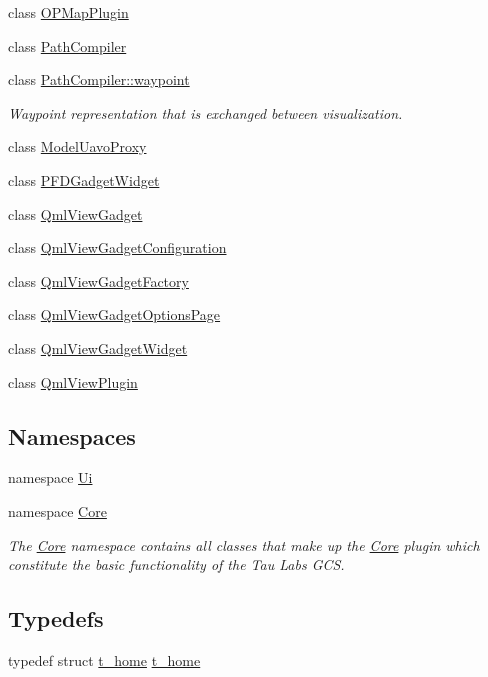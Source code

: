 \begin{DoxyCompactItemize}
\item 
class \hyperlink{class_o_p_map_plugin}{\-O\-P\-Map\-Plugin}
\item 
class \hyperlink{class_path_compiler}{\-Path\-Compiler}
\item 
class \hyperlink{class_path_compiler_1_1waypoint}{\-Path\-Compiler\-::waypoint}
\begin{DoxyCompactList}\small\item\em \-Waypoint representation that is exchanged between visualization. \end{DoxyCompactList}\item 
class \hyperlink{class_model_uavo_proxy}{\-Model\-Uavo\-Proxy}
\item 
class \hyperlink{class_p_f_d_gadget_widget}{\-P\-F\-D\-Gadget\-Widget}
\item 
class \hyperlink{class_qml_view_gadget}{\-Qml\-View\-Gadget}
\item 
class \hyperlink{class_qml_view_gadget_configuration}{\-Qml\-View\-Gadget\-Configuration}
\item 
class \hyperlink{class_qml_view_gadget_factory}{\-Qml\-View\-Gadget\-Factory}
\item 
class \hyperlink{class_qml_view_gadget_options_page}{\-Qml\-View\-Gadget\-Options\-Page}
\item 
class \hyperlink{class_qml_view_gadget_widget}{\-Qml\-View\-Gadget\-Widget}
\item 
class \hyperlink{class_qml_view_plugin}{\-Qml\-View\-Plugin}
\end{DoxyCompactItemize}
\subsection*{\-Namespaces}
\begin{DoxyCompactItemize}
\item 
namespace \hyperlink{namespace_ui}{\-Ui}
\item 
namespace \hyperlink{namespace_core}{\-Core}
\begin{DoxyCompactList}\small\item\em \-The \hyperlink{namespace_core}{\-Core} namespace contains all classes that make up the \hyperlink{namespace_core}{\-Core} plugin which constitute the basic functionality of the \-Tau \-Labs \-G\-C\-S. \end{DoxyCompactList}\end{DoxyCompactItemize}
\subsection*{\-Typedefs}
\begin{DoxyCompactItemize}
\item 
typedef struct \hyperlink{structt__home}{t\-\_\-home} \hyperlink{group___o_p_map_plugin_ga11ae47f39c6685b33aac90d5bc1ce28f}{t\-\_\-home}
\end{DoxyCompactItemize}
